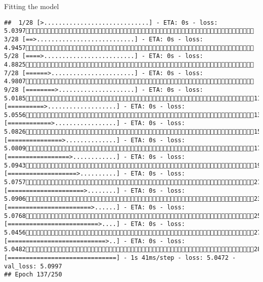 \documentclass[
  ignorenonframetext,
]{beamer}
\begin{document}
\begin{frame}[fragile]{Fitting the model}
\begin{verbatim}
##  1/28 [>.............................] - ETA: 0s - loss: 5.0397 3/28 [==>...........................] - ETA: 0s - loss: 4.9457 5/28 [====>.........................] - ETA: 0s - loss: 4.8825 7/28 [======>.......................] - ETA: 0s - loss: 4.9807 9/28 [========>.....................] - ETA: 0s - loss: 5.018511/28 [==========>...................] - ETA: 0s - loss: 5.055613/28 [============>.................] - ETA: 0s - loss: 5.082615/28 [===============>..............] - ETA: 0s - loss: 5.080917/28 [=================>............] - ETA: 0s - loss: 5.094319/28 [===================>..........] - ETA: 0s - loss: 5.075721/28 [=====================>........] - ETA: 0s - loss: 5.090623/28 [=======================>......] - ETA: 0s - loss: 5.076825/28 [=========================>....] - ETA: 0s - loss: 5.045627/28 [===========================>..] - ETA: 0s - loss: 5.048228/28 [==============================] - 1s 41ms/step - loss: 5.0472 - val_loss: 5.0997
## Epoch 137/250

\end{verbatim}
\end{frame}
\end{document}
